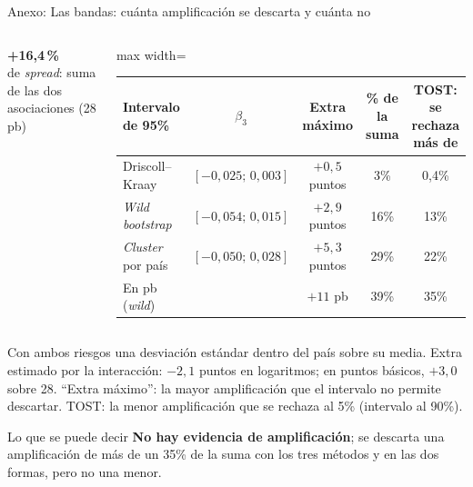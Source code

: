 \documentclass[aspectratio=169]{beamer}
\newcommand{\cifra}[2]{\begin{center}{\Huge\bfseries\color{tesisblue}#1}\\[2pt]{\small #2}\end{center}}
\begin{document}
\begin{frame}{Anexo: Las bandas: cuánta amplificación se descarta y cuánta no}
\begin{columns}[c]
\cifra{+16,4\,\%}{de \textit{spread}: suma de las dos asociaciones (28 pb)}
\centering
\small
\begin{adjustbox}{max width=\textwidth}
\begin{tabular}{l cccc}
\toprule
Intervalo de 95\% & $\beta_3$ & Extra máximo & \% de la suma & TOST: se rechaza más de \\
\midrule
Driscoll--Kraay & $[-0{,}025;\,0{,}003]$ & $+0{,}5$ puntos & 3\% & 0,4\% \\
\textit{Wild bootstrap} & $[-0{,}054;\,0{,}015]$ & $+2{,}9$ puntos & 16\% & 13\% \\
\textit{Cluster} por país & $[-0{,}050;\,0{,}028]$ & $+5{,}3$ puntos & 29\% & 22\% \\
En pb (\textit{wild}) & & $+11$ pb & 39\% & 35\% \\
\bottomrule
\end{tabular}
\end{adjustbox}
\end{columns}
\vspace{2pt}
{\footnotesize\raggedright Con ambos riesgos una desviación estándar dentro del país sobre su media. Extra estimado por la interacción: $-2{,}1$ puntos en logaritmos; en puntos básicos, $+3{,}0$ sobre 28. ``Extra máximo'': la mayor amplificación que el intervalo no permite descartar. TOST: la menor amplificación que se rechaza al 5\% (intervalo al 90\%).\par}
\vspace{-2pt}
\begin{alertblock}{Lo que se puede decir}
\footnotesize \textbf{No hay evidencia de amplificación}; se descarta una amplificación de más de un 35\% de la suma con los tres métodos y en las dos formas, pero no una menor.
\end{alertblock}
\end{frame}
\end{document}
